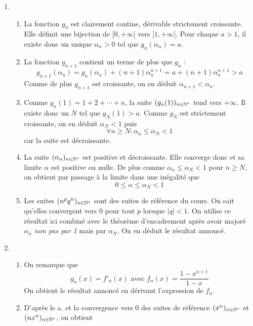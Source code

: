 \begin{enumerate}
 \item \begin{enumerate}
 \item La fonction $g_n$ est clairement contine, dérivable strictement croissante. Elle définit une bijection de $[0,+\infty[$ vers $[1,+\infty[$. Pour chaque $a>1$, il existe donc un unique $\alpha_n >0$ tel que $g_n(\alpha_n)=a$.
\item La fonction $g_{n+1}$ contient un terme de plus que $g_n$ :
\begin{displaymath}
 g_{n+1}(\alpha_n)=g_n(\alpha_n) + (n+1)\alpha_n^{n+1} = a+(n+1)\alpha_n^{n+1} >a
\end{displaymath}
Comme de plus $g_{n+1}$ est croissante, on en déduit $\alpha_{n+1}<\alpha_n$.
\item Comme $g_n(1)=1+2+\cdots+n$, la suite $(g_n(1))_{n\in \mathbb{N}^*}$ tend vers $+\infty$. Il existe donc un $N$ tel que $g_N(1)>a$. Comme $g_N$ est strictement croissante, on en déduit $\alpha_N <1$ puis
\begin{displaymath}
 \forall n\geq N : \alpha_n\leq \alpha_N <1
\end{displaymath}
car la suite est décroissante.
\item La suite $(\alpha_n)_{n\in \mathbb{N}^*}$ est positive et décroissante. Elle converge donc et sa limite $\alpha$ est positive ou nulle. De plus comme $\alpha_n\leq \alpha_N <1$ pour $n\geq N$, on obtient par passage à la limite dans une inégalité que
\begin{displaymath}
 0\leq \alpha \leq \alpha_N <1
\end{displaymath}
\item Les suites $(n^pq^n)_{n\in \mathbb{N}^*}$ sont des suites de référence du cours. On sait qu'elles convergent vers $0$ pour tout $p$ lorsque $|q|<1$. On utilise ce résultat ici combiné avec le théorème d'encadrement après avoir majoré $\alpha_n$ \emph{non pas par 1} mais par $\alpha_N$. On en déduit le résultat annoncé.
\end{enumerate}
\item \begin{enumerate}
 \item On remarque que 
\begin{displaymath}
 g_n(x) = f'_n(x) \text{ avec } f_n(x) = \dfrac{1-x^{n+1}}{1-x}
\end{displaymath}
On obtient le résultat annoncé en dérivant l'expression de $f_n$.
\item D'après le a. et la convergence vers $0$ des suites de référence $(x^n)_{n\in \mathbb{N}^*}$ et $(nx^n)_{n\in \mathbb{N}^*}$, on obtient 

\end{enumerate}
\end{enumerate}

